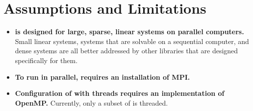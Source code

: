 
\section{Assumptions and Limitations}

\begin{itemize}

\item
{\bf \hypre{} is designed for large, sparse, linear systems on
parallel computers.}  Small linear systems, systems that are solvable
on a sequential computer, and dense systems are all better addressed
by other libraries that are designed specifically for them.

\item
{\bf To run in parallel, \hypre{} requires an installation of MPI.}

\item
{\bf Configuration of \hypre{} with threads requires an implementation
of OpenMP.}  Currently, only a subset of \hypre{} is threaded.

\end{itemize}

